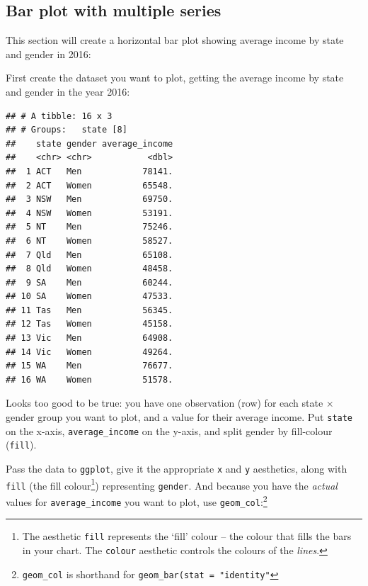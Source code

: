 \documentclass[]{book}
\newenvironment{Shaded}{\begin{snugshade}}{\end{snugshade}}
\newcommand{\DataTypeTok}[1]{\textcolor[rgb]{0.13,0.29,0.53}{#1}}
\newcommand{\DecValTok}[1]{\textcolor[rgb]{0.00,0.00,0.81}{#1}}
\newcommand{\KeywordTok}[1]{\textcolor[rgb]{0.13,0.29,0.53}{\textbf{#1}}}
\newcommand{\NormalTok}[1]{#1}
\newcommand{\OperatorTok}[1]{\textcolor[rgb]{0.81,0.36,0.00}{\textbf{#1}}}
\newcommand{\StringTok}[1]{\textcolor[rgb]{0.31,0.60,0.02}{#1}}
\begin{document}
\hypertarget{bar-multi}{%
\subsection{Bar plot with multiple series}\label{bar-multi}}

This section will create a horizontal bar plot showing average income by state and gender in 2016:

First create the dataset you want to plot, getting the average income by state and gender in the year 2016:

\begin{Shaded}
\end{Shaded}

\begin{verbatim}
## # A tibble: 16 x 3
## # Groups:   state [8]
##    state gender average_income
##    <chr> <chr>           <dbl>
##  1 ACT   Men            78141.
##  2 ACT   Women          65548.
##  3 NSW   Men            69750.
##  4 NSW   Women          53191.
##  5 NT    Men            75246.
##  6 NT    Women          58527.
##  7 Qld   Men            65108.
##  8 Qld   Women          48458.
##  9 SA    Men            60244.
## 10 SA    Women          47533.
## 11 Tas   Men            56345.
## 12 Tas   Women          45158.
## 13 Vic   Men            64908.
## 14 Vic   Women          49264.
## 15 WA    Men            76677.
## 16 WA    Women          51578.
\end{verbatim}

Looks too good to be true: you have one observation (row) for each state \(\times\) gender group you want to plot, and a value for their average income. Put \texttt{state} on the x-axis, \texttt{average\_income} on the y-axis, and split gender by fill-colour (\texttt{fill}).

Pass the data to \texttt{ggplot}, give it the appropriate \texttt{x} and \texttt{y} aesthetics, along with \texttt{fill} (the fill colour\footnote{The aesthetic \texttt{fill} represents the `fill' colour -- the colour that fills the bars in your chart. The \texttt{colour} aesthetic controls the colours of the \emph{lines}.}) representing \texttt{gender}. And because you have the \emph{actual} values for \texttt{average\_income} you want to plot, use \texttt{geom\_col}:\footnote{\texttt{geom\_col} is shorthand for \texttt{geom\_bar(stat\ =\ "identity"}}
\end{document}
